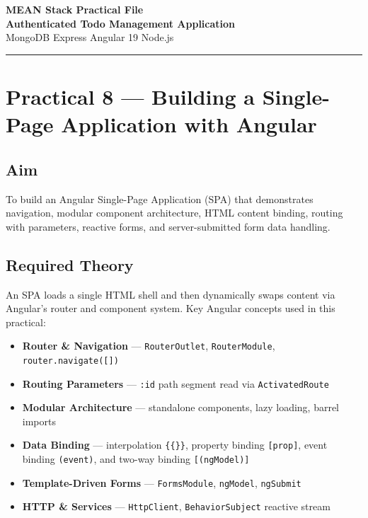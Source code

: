 \documentclass[11pt,a4paper]{article}
\begin{document}
\begin{center}
  {\LARGE\bfseries\color{headerblue} MEAN Stack Practical File}\\[0.5em]
  {\large\bfseries Authenticated Todo Management Application}\\[0.3em]
  {\normalsize MongoDB \textbullet{} Express \textbullet{} Angular 19 \textbullet{} Node.js}
\end{center}

\noindent\rule{\linewidth}{0.8pt}

\section*{Practical 8 — Building a Single-Page Application with Angular}

\subsection*{Aim}
To build an Angular Single-Page Application (SPA) that demonstrates navigation, modular
component architecture, HTML content binding, routing with parameters, reactive forms, and
server-submitted form data handling.

\subsection*{Required Theory}
An SPA loads a single HTML shell and then dynamically swaps content via Angular's router and
component system.  Key Angular concepts used in this practical:

\begin{itemize}
  \item \textbf{Router \& Navigation} — \texttt{RouterOutlet}, \texttt{RouterModule},
        \texttt{router.navigate([])}
  \item \textbf{Routing Parameters} — \texttt{:id} path segment read via \texttt{ActivatedRoute}
  \item \textbf{Modular Architecture} — standalone components, lazy loading, barrel imports
  \item \textbf{Data Binding} — interpolation \texttt{\{\{\}\}}, property binding \texttt{[prop]},
        event binding \texttt{(event)}, and two-way binding \texttt{[(ngModel)]}
  \item \textbf{Template-Driven Forms} — \texttt{FormsModule}, \texttt{ngModel},
        \texttt{ngSubmit}
  \item \textbf{HTTP \& Services} — \texttt{HttpClient}, \texttt{BehaviorSubject} reactive stream
\end{itemize}
\end{document}
